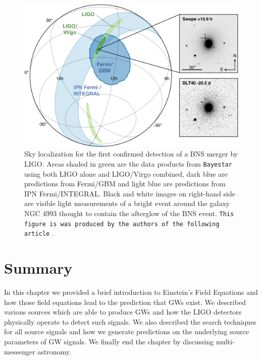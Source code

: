 %
%

\begin{figure}
    \centering
    \includegraphics[width=\linewidth]{figures/GW170817_skymap.jpg}
    \caption{Sky localization for the first confirmed detection of a \ac{BNS} merger by \ac{LIGO}. Areas shaded in green are the data products from \texttt{Bayestar} using both \ac{LIGO} alone and \ac{LIGO}/Virgo combined, dark blue are predictions from Fermi/GBM and light blue are predictions from IPN Fermi/INTEGRAL. Black and white images on right-hand side are visible light measurements of a bright event around the galaxy NGC 4993 thought to contain the afterglow of the \ac{BNS} event. \texttt{This figure is was produced by the authors of the following article} \cite{2017arXiv171005833L}. }
    \label{fig:gw_plus_cross}
\end{figure}

\section{Summary}

In this chapter we provided a brief introduction to Einstein's 
Field Equations and how those field equations lead to the prediction 
that \ac{GW}s exist. We described various sources which are 
able to produce \ac{GW}s and how the \ac{LIGO} detectors physically operate 
to detect such signals. We also described the search techniques for 
all source signals and how we generate predictions on the underlying 
source parameters of \ac{GW} signals. We finally end the chapter by 
discussing multi-messenger astronomy.

